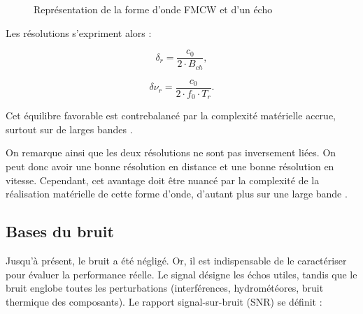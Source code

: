 \begin{figure}[htbp]
    \caption{Représentation de la forme d'onde FMCW et d'un écho}
    \label{fig:fmcw_avec_echo}
\end{figure}
\FloatBarrier

\noindent Les résolutions s’expriment alors \cite{richards2010} :

\begin{equation}
    \delta_r = \frac{c_0}{2\cdot B_{ch}},
    \label{eq:resolution_distance_fmcw_triangulaire}
\end{equation}

\begin{equation}
    \delta\nu_r = \frac{c_0}{2\cdot f_0\cdot T_r}.
    \label{eq:resolution_vitesse_fmcw_triangulaire}
\end{equation}

Cet équilibre favorable est contrebalancé par la complexité matérielle accrue, surtout sur de larges bandes \cite{meta2007performance}.

On remarque ainsi que les deux résolutions ne sont pas inversement liées. On peut donc avoir une bonne résolution en distance et une bonne résolution en vitesse. Cependant, cet avantage doit être nuancé par la complexité de la réalisation matérielle de cette forme d'onde, d'autant plus sur une large bande \cite{meta2007performance}. 

\subsection{Bases du bruit}

Jusqu’à présent, le bruit a été négligé. Or, il est indispensable de le caractériser pour évaluer la performance réelle. Le signal désigne les échos utiles, tandis que le bruit englobe toutes les perturbations (interférences, hydrométéores, bruit thermique des composants). Le rapport signal-sur-bruit (SNR) se définit \cite{skolnik2001} :

